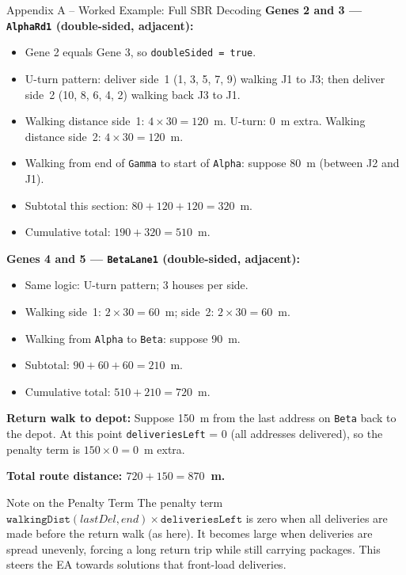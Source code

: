 \documentclass[aspectratio=169,10pt]{beamer}
\begin{document}
\begin{frame}[allowframebreaks]{Appendix A -- Worked Example: Full SBR Decoding}
  \textbf{Genes 2 and 3 --- \texttt{AlphaRd1} (double-sided, adjacent):}
  \begin{itemize}
    \item Gene 2 equals Gene 3, so \texttt{doubleSided = true}.
    \item U-turn pattern: deliver side~1 (1, 3, 5, 7, 9) walking J1 to J3;
      then deliver side~2 (10, 8, 6, 4, 2) walking back J3 to J1.
    \item Walking distance side~1: $4 \times 30 = 120$~m.  U-turn: 0~m extra.
      Walking distance side~2: $4 \times 30 = 120$~m.
    \item Walking from end of \texttt{Gamma} to start of \texttt{Alpha}:
      suppose 80~m (between J2 and J1).
    \item Subtotal this section: $80 + 120 + 120 = 320$~m.
    \item Cumulative total: $190 + 320 = 510$~m.
  \end{itemize}

  \textbf{Genes 4 and 5 --- \texttt{BetaLane1} (double-sided, adjacent):}
  \begin{itemize}
    \item Same logic: U-turn pattern; 3 houses per side.
    \item Walking side~1: $2 \times 30 = 60$~m; side~2: $2 \times 30 = 60$~m.
    \item Walking from \texttt{Alpha} to \texttt{Beta}: suppose 90~m.
    \item Subtotal: $90 + 60 + 60 = 210$~m.
    \item Cumulative total: $510 + 210 = 720$~m.
  \end{itemize}

  \textbf{Return walk to depot:}
  Suppose 150~m from the last address on \texttt{Beta} back to the depot.
  At this point \texttt{deliveriesLeft} = 0 (all addresses delivered),
  so the penalty term is $150 \times 0 = 0$~m extra.

  \textbf{Total route distance: $720 + 150 = 870$~m.}

  \begin{alertblock}{Note on the Penalty Term}
    The penalty term $\mathtt{walkingDist}(lastDel, end) \times
    \mathtt{deliveriesLeft}$ is zero when all deliveries are made before
    the return walk (as here).  It becomes large when deliveries are spread
    unevenly, forcing a long return trip while still carrying packages.
    This steers the EA towards solutions that front-load deliveries.
  \end{alertblock}

\end{frame}
\end{document}
